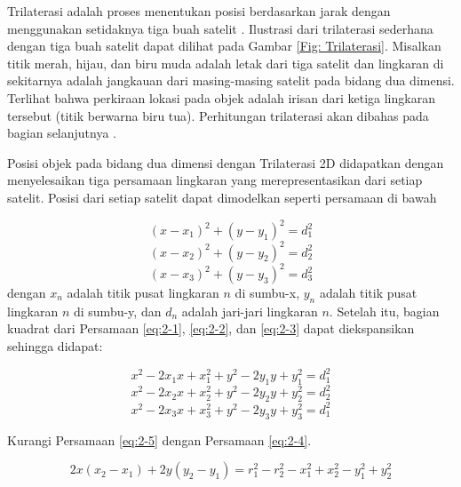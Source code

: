 Trilaterasi adalah proses menentukan posisi berdasarkan jarak dengan menggunakan setidaknya tiga buah satelit \cite{AmericanSocietyofCivilEngineers1994}. Ilustrasi dari trilaterasi sederhana dengan tiga buah satelit dapat dilihat pada Gambar \ref{Fig: Trilaterasi}. Misalkan titik merah, hijau, dan biru muda adalah letak dari tiga satelit dan lingkaran di sekitarnya adalah jangkauan dari masing-masing satelit pada bidang dua dimensi. Terlihat bahwa perkiraan lokasi pada objek adalah irisan dari ketiga lingkaran tersebut (titik berwarna biru tua). Perhitungan trilaterasi akan dibahas pada bagian selanjutnya \cite{Seo2012}.

Posisi objek pada bidang dua dimensi dengan Trilaterasi 2D didapatkan dengan menyelesaikan tiga persamaan lingkaran yang merepresentasikan dari setiap satelit. Posisi dari setiap satelit dapat dimodelkan seperti persamaan di bawah

\begin{equation}
	\left(x-x_1\right)^2 + \left(y-y_1\right)^2=d_1^2
	\label{eq:2-1}
\end{equation}
\begin{equation}
	\left(x-x_2\right)^2 + \left(y-y_2\right)^2=d_2^2
	\label{eq:2-2}
\end{equation}
\begin{equation}
	\left(x-x_3\right)^2 + \left(y-y_3\right)^2=d_3^2
	\label{eq:2-3}
\end{equation}
dengan $x_n$ adalah titik pusat lingkaran $n$ di sumbu-x, $y_n$ adalah titik pusat lingkaran $n$ di sumbu-y, dan $d_n$ adalah jari-jari lingkaran $n$. Setelah itu, bagian kuadrat dari Persamaan \ref{eq:2-1}, \ref{eq:2-2}, dan \ref{eq:2-3} dapat diekspansikan sehingga didapat:

\begin{equation}
	x^2-2x_1x+x_1^2+y^2-2y_1y+y_1^2=d_1^2
	\label{eq:2-4}
\end{equation}
\begin{equation}
	x^2-2x_2x+x_2^2+y^2-2y_2y+y_2^2=d_2^2
	\label{eq:2-5}
\end{equation}
\begin{equation}
	x^2-2x_3x+x_3^2+y^2-2y_3y+y_3^2=d_1^2
	\label{eq:2-6}
\end{equation}

Kurangi Persamaan \ref{eq:2-5} dengan  Persamaan \ref{eq:2-4}.

\begin{equation}
	2x \left(x_2-x_1\right) + 2y \left(y_2 - y_1\right) = r_1^2 - r_2^2 - x_1^2 + x_2^2- y_1^2 + y_2^2
	\label{eq:2-7}
\end{equation}

